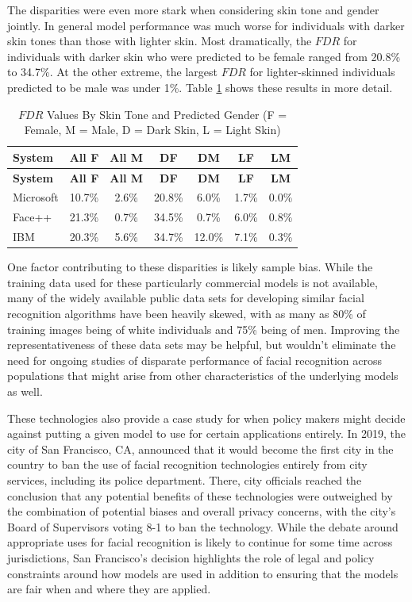 \documentclass[]{krantz}
\begin{document}
The disparities were even more stark when considering skin tone and
gender jointly. In general model performance was much worse for
individuals with darker skin tones than those with lighter skin. Most
dramatically, the \(FDR\) for individuals with darker skin who were
predicted to be female ranged from 20.8\% to 34.7\%. At the other
extreme, the largest \(FDR\) for lighter-skinned individuals predicted
to be male was under 1\%. Table \ref{tab:facialrectable} shows these
results in more detail.

\begin{longtable}[]{@{}lcccccc@{}}
\caption{\label{tab:facialrectable} \(FDR\) Values By Skin Tone and
Predicted Gender (F = Female, M = Male, D = Dark Skin, L = Light
Skin)}\tabularnewline
\toprule
\textbf{System} & \textbf{All F} & \textbf{All M} & \textbf{DF} &
\textbf{DM} & \textbf{LF} & \textbf{LM}\tabularnewline
\midrule
\endfirsthead
\toprule
\textbf{System} & \textbf{All F} & \textbf{All M} & \textbf{DF} &
\textbf{DM} & \textbf{LF} & \textbf{LM}\tabularnewline
\midrule
\endhead
Microsoft & 10.7\% & 2.6\% & 20.8\% & 6.0\% & 1.7\% &
0.0\%\tabularnewline
Face++ & 21.3\% & 0.7\% & 34.5\% & 0.7\% & 6.0\% & 0.8\%\tabularnewline
IBM & 20.3\% & 5.6\% & 34.7\% & 12.0\% & 7.1\% & 0.3\%\tabularnewline
\bottomrule
\end{longtable}

One factor contributing to these disparities is likely sample bias.
While the training data used for these particularly commercial models is
not available, many of the widely available public data sets for
developing similar facial recognition algorithms have been heavily
skewed, with as many as 80\% of training images being of white
individuals and 75\% being of men. Improving the representativeness of
these data sets may be helpful, but wouldn't eliminate the need for
ongoing studies of disparate performance of facial recognition across
populations that might arise from other characteristics of the
underlying models as well.

These technologies also provide a case study for when policy makers
might decide against putting a given model to use for certain
applications entirely. In 2019, the city of San Francisco, CA, announced
that it would become the first city in the country to ban the use of
facial recognition technologies entirely from city services, including
its police department. There, city officials reached the conclusion that
any potential benefits of these technologies were outweighed by the
combination of potential biases and overall privacy concerns, with the
city's Board of Supervisors voting 8-1 to ban the technology. While the
debate around appropriate uses for facial recognition is likely to
continue for some time across jurisdictions, San Francisco's decision
highlights the role of legal and policy constraints around how models
are used in addition to ensuring that the models are fair when and where
they are applied.
\end{document}
